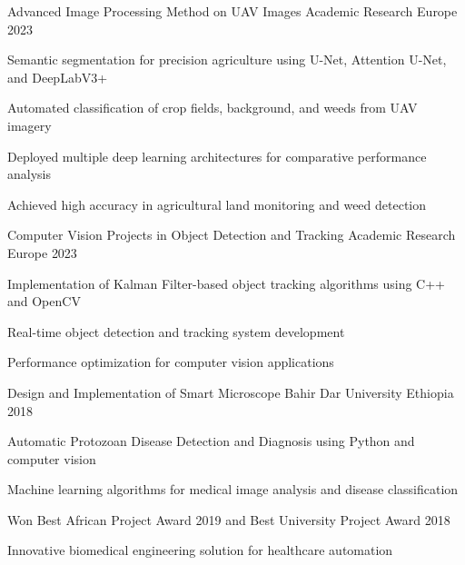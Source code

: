 \begin{cventries}
  \cventry
    {Advanced Image Processing Method on UAV Images} %
    {Academic Research} %
    {Europe} %
    {2023} %
    {
      \begin{cvitems}
        \item {Semantic segmentation for precision agriculture using U-Net, Attention U-Net, and DeepLabV3+}
        \item {Automated classification of crop fields, background, and weeds from UAV imagery}
        \item {Deployed multiple deep learning architectures for comparative performance analysis}
        \item {Achieved high accuracy in agricultural land monitoring and weed detection}
      \end{cvitems}
    }

  \cventry
    {Computer Vision Projects in Object Detection and Tracking} %
    {Academic Research} %
    {Europe} %
    {2023} %
    {
      \begin{cvitems}
        \item {Implementation of Kalman Filter-based object tracking algorithms using C++ and OpenCV}
        \item {Real-time object detection and tracking system development}
        \item {Performance optimization for computer vision applications}
      \end{cvitems}
    }

  \cventry
    {Design and Implementation of Smart Microscope} %
    {Bahir Dar University} %
    {Ethiopia} %
    {2018} %
    {
      \begin{cvitems}
        \item {Automatic Protozoan Disease Detection and Diagnosis using Python and computer vision}
        \item {Machine learning algorithms for medical image analysis and disease classification}
        \item {Won Best African Project Award 2019 and Best University Project Award 2018}
        \item {Innovative biomedical engineering solution for healthcare automation}
      \end{cvitems}
    }

\end{cventries}
